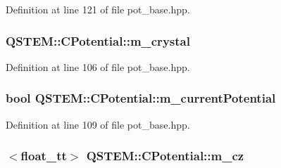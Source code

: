 Definition at line 121 of file pot\-\_\-base.\-hpp.

\hypertarget{class_q_s_t_e_m_1_1_c_potential_ac8dff71355c172835edb00493b39fe91}{
\subsubsection[{m\-\_\-crystal}]{ Q\-S\-T\-E\-M\-::\-C\-Potential\-::m\-\_\-crystal\hspace{0.3cm}{\ttfamily [protected]}}}\label{class_q_s_t_e_m_1_1_c_potential_ac8dff71355c172835edb00493b39fe91}


Definition at line 106 of file pot\-\_\-base.\-hpp.

\hypertarget{class_q_s_t_e_m_1_1_c_potential_ae2ca76e0f9d7815bb38a08205dccbc08}{
\subsubsection[{m\-\_\-current\-Potential}]{\setlength{\rightskip}{0pt plus 5cm}bool Q\-S\-T\-E\-M\-::\-C\-Potential\-::m\-\_\-current\-Potential\hspace{0.3cm}{\ttfamily [protected]}}}\label{class_q_s_t_e_m_1_1_c_potential_ae2ca76e0f9d7815bb38a08205dccbc08}


Definition at line 109 of file pot\-\_\-base.\-hpp.

\hypertarget{class_q_s_t_e_m_1_1_c_potential_a8c401afb43416b1629c43897faa16b16}{
\subsubsection[{m\-\_\-cz}]{$<${\bf float\-\_\-tt}$>$ Q\-S\-T\-E\-M\-::\-C\-Potential\-::m\-\_\-cz\hspace{0.3cm}{\ttfamily [protected]}}}\label{class_q_s_t_e_m_1_1_c_potential_a8c401afb43416b1629c43897faa16b16}


